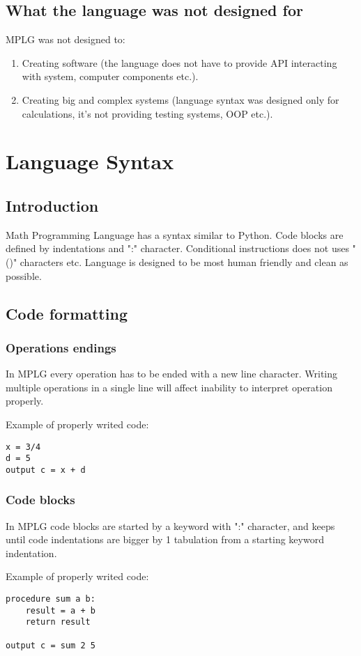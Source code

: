 \documentclass[a4paper]{report}
\begin{document}
\section{What the language was not designed for}
MPLG was not designed to:
\begin{enumerate}
  \item Creating software (the language does not have to provide API interacting with system, computer components etc.).
  \item Creating big and complex systems (language syntax was designed only for calculations, it's not providing testing systems, OOP etc.).
\end{enumerate}

\chapter{Language Syntax}
\section{Introduction}
Math Programming Language has a syntax similar to Python. Code blocks are defined by 
indentations and ":" character. Conditional instructions does not uses "()" characters etc. Language is designed to be most human friendly and clean as possible.

\section{Code formatting}
\subsection{Operations endings}
In MPLG every operation has to be ended with a new line character. Writing multiple operations in a single line will affect inability to interpret operation properly.

Example of properly writed code:
\begin{lstlisting}
x = 3/4
d = 5
output c = x + d
\end{lstlisting}

\subsection{Code blocks}
In MPLG code blocks are started by a keyword with ":" character, and keeps until code indentations are bigger by 1 tabulation from a starting keyword indentation.

Example of properly writed code:
\begin{lstlisting}
procedure sum a b:
	result = a + b
	return result

output c = sum 2 5
\end{lstlisting}
\end{document}
